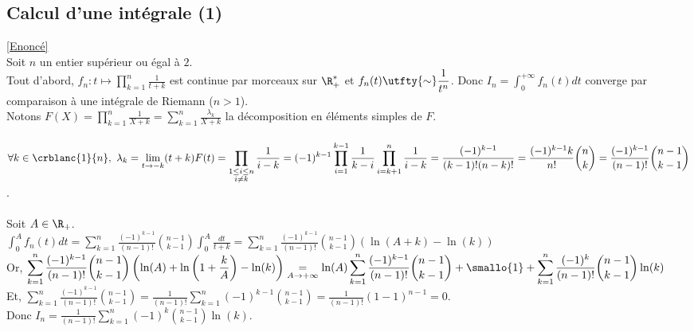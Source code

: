 \documentclass{book}
\begin{document}
	\subsection{Calcul d'une intégrale (1) }
	\label{sec:calcul-dune-integrale-1-etoile3}
	\textcolor{blue}{\hyperref[calculintégrale1]{[Enoncé]}}\\
	Soit $n$ un entier supérieur ou égal à $2$.\\
	Tout d'abord, $f_n:t\mapsto \displaystyle\prod\limits_{k=1}^n\frac{1}{t+k}$ est continue par morceaux sur $\R^*_+$ et $f_n(t)\utfty{\sim} \displaystyle\frac{1}{t^n}$. Donc $I_n=\displaystyle\int_0^{+\infty}f_n(t)dt$ converge par comparaison à une intégrale de Riemann ($n>1$).\\
	Notons $F(X)=\displaystyle\prod\limits_{k=1}^n\frac{1}{X+k}=\displaystyle\sum\limits_{k=1}^n\frac{\lambda_k}{X+k}$ la décomposition en éléments simples de $F$.\\\\
	$\forall k\in \crblanc{1}{n},\ \lambda_k=\lim\limits_{t\to -k}(t+k)F(t)=\displaystyle\prod\limits_{\substack{1\leq i\leq n\\i\ne k}}\frac{1}{i-k}=(-1)^{k-1}\prod\limits_{i=1}^{k-1}\frac{1}{k-i}\prod\limits_{i=k+1}^n\frac{1}{i-k}=\frac{(-1)^{k-1}}{(k-1)!(n-k)!}=\frac{(-1)^{k-1}k}{n!}\binom{n}{k}=\frac{(-1)^{k-1}}{(n-1)!}\binom{n-1}{k-1}$.\\\\
	Soit $A\in \R_+$.\\
	$\displaystyle\int_0^Af_n(t)dt=\sum\limits_{k=1}^n\frac{(-1)^{k-1}}{(n-1)!}\binom{n-1}{k-1}\int_0^A\frac{dt}{t+k}=\sum\limits_{k=1}^n\frac{(-1)^{k-1}}{(n-1)!}\binom{n-1}{k-1}(\ln(A+k)-\ln(k))$\\
	Or, $\displaystyle\sum\limits_{k=1}^n\frac{(-1)^{k-1}}{(n-1)!}\binom{n-1}{k-1}\left(\ln(A)+\ln\left(1+\frac{k}{A}\right)-\ln(k)\right)\underset{A\to +\infty}{=}\ln(A)\sum\limits_{k=1}^n\frac{(-1)^{k-1}}{(n-1)!}\binom{n-1}{k-1}+\smallo{1}+\sum\limits_{k=1}^n\frac{(-1)^k}{(n-1)!}\binom{n-1}{k-1}\ln(k)$\\
	Et, $\displaystyle\sum\limits_{k=1}^n\frac{(-1)^{k-1}}{(n-1)!}\binom{n-1}{k-1}=\frac{1}{(n-1)!}\sum\limits_{k=1}^n(-1)^{k-1}\binom{n-1}{k-1}=\frac{1}{(n-1)!}(1-1)^{n-1}=0$.\\
	Donc $I_n=\displaystyle\frac{1}{(n-1)!}\sum\limits_{k=1}^n(-1)^k\binom{n-1}{k-1}\ln(k)$.
	
\end{document}
